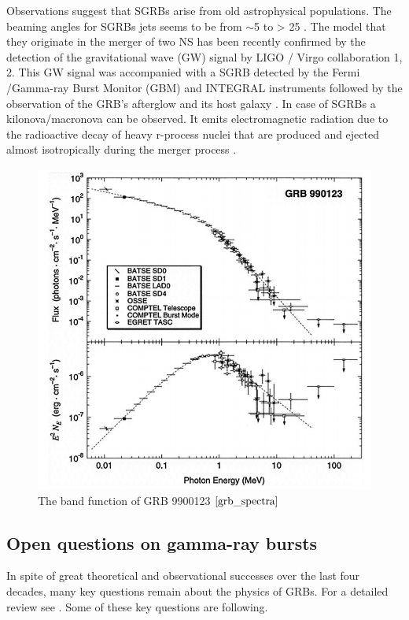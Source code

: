 \documentclass[12pt, a4paper,titlepage]{article}
\numberwithin{equation}{section}
\numberwithin{figure}{section}
\begin{document}
Observations suggest that SGRBs arise from old astrophysical populations. The beaming angles for SGRBs jets seems to be from $\sim$5 to > 25 \cite{grb16}. The model that they originate in the merger of two NS has been recently confirmed by the detection of the gravitational wave (GW) signal by LIGO / Virgo collaboration 1, 2. This GW signal was accompanied with a SGRB detected by the Fermi /Gamma-ray Burst Monitor (GBM) and INTEGRAL instruments followed by the observation of the GRB’s afterglow and its host galaxy \cite{grb17}. In case of SGRBs a kilonova/macronova can be observed. It emits electromagnetic radiation due to the radioactive decay of heavy r-process nuclei that are produced and ejected almost isotropically during the merger process \cite{grb18}.

\begin{figure}[H]
\centering
\includegraphics[width=130.0mm]{images/grb_spectra.png}
\caption{The band function of GRB 9900123 $\cite{grb_spectra}$}
\end{figure}

\subsection{Open questions on gamma-ray bursts}

In spite of great theoretical and observational successes over the last four decades, many key questions remain about the physics of GRBs. For a detailed review see \cite{grb19}. Some of these key questions are following.
\end{document}
